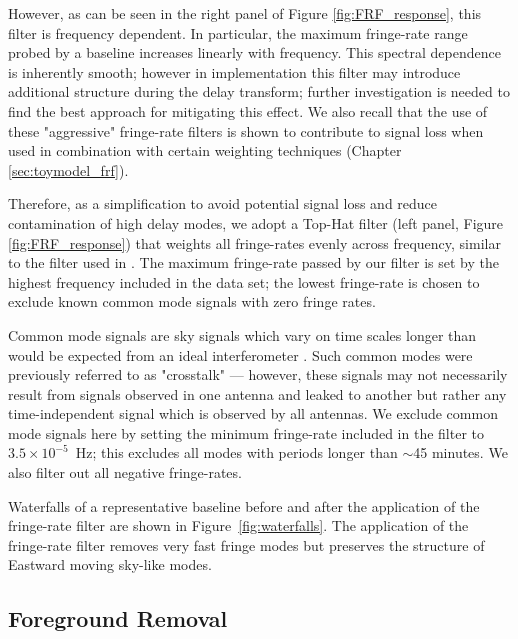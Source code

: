 However, as can be seen in the right panel of Figure \ref{fig:FRF_response}, this filter is frequency dependent.
In particular, the maximum fringe-rate range probed by a baseline increases linearly with frequency.
This spectral dependence is inherently smooth; however in implementation this filter may introduce additional structure during the delay transform; further investigation is needed to find the best approach for mitigating this effect.
We also recall that the use of these "aggressive" fringe-rate filters is shown to contribute to signal loss when used in combination with certain weighting techniques
(Chapter \ref{sec:toymodel_frf}).

Therefore, as a simplification to avoid potential signal loss
and reduce contamination of high delay modes,
we adopt a Top-Hat filter (left panel, Figure \ref{fig:FRF_response})
that weights all fringe-rates evenly across frequency, similar to the filter used in \citet{parsons_et_al2012b}.
The maximum fringe-rate passed by our filter is set
by the highest frequency
included in the data set; the lowest fringe-rate is chosen to exclude known common mode signals with zero fringe
rates.

Common mode signals are sky signals which vary on time scales longer than would be expected from an ideal interferometer \citep{ali_et_al2015}.
Such common modes were previously referred to as
	"crosstalk" --- however, these signals may not
	necessarily result from signals observed in one antenna and leaked to another but rather any time-independent signal which is observed by all antennas. We exclude common mode signals here by setting the minimum fringe-rate included in the filter to $3.5\times10^{-5}$~Hz; this
excludes all modes with periods longer than $\sim$45 minutes. We also filter out all negative fringe-rates.


Waterfalls of a representative baseline
before and after the application of the
fringe-rate filter are shown in Figure~\ref{fig:waterfalls}.
The application of the fringe-rate filter removes very fast
fringe modes but preserves the structure of Eastward moving sky-like modes.

\subsection{Foreground Removal}\label{sec:wida}

